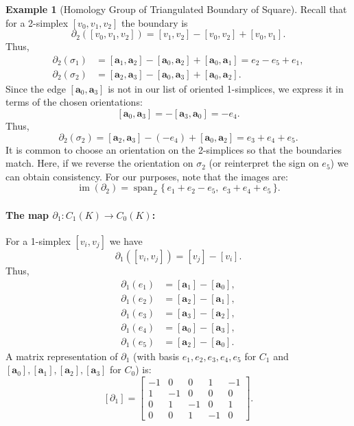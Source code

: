 \documentclass[12pt,oneside,reqno]{amsart}
\theoremstyle{plain}
\theoremstyle{definition}
\newtheorem{example}{Example}[section]
\theoremstyle{remark}
\newcommand{\0}{{\textbf{0}}}
\begin{document}
\begin{example}[Homology Group of Triangulated Boundary of Square]
Recall that for a 2-simplex \([v_0,v_1,v_2]\) the boundary is
\[
\partial_2([v_0,v_1,v_2]) = [v_1,v_2] - [v_0,v_2] + [v_0,v_1].
\]
Thus,
\[
\begin{aligned}
\partial_2(\sigma_1) &= [\bm{a}_1,\bm{a}_2] - [\bm{a}_0,\bm{a}_2] + [\bm{a}_0,\bm{a}_1] = e_2 - e_5 + e_1, \\
\partial_2(\sigma_2) &= [\bm{a}_2,\bm{a}_3] - [\bm{a}_0,\bm{a}_3] + [\bm{a}_0,\bm{a}_2].
\end{aligned}
\]
Since the edge \([\bm{a}_0, \bm{a}_3]\) is not in our list of oriented 1-simplices, we express it in terms of the chosen orientations:
\[
[\bm{a}_0,\bm{a}_3] = -[\bm{a}_3,\bm{a}_0] = -e_4.
\]
Thus, 
\[
\partial_2(\sigma_2) = [\bm{a}_2,\bm{a}_3] - (-e_4) + [\bm{a}_0,\bm{a}_2] = e_3 + e_4 + e_5.
\]
It is common to choose an orientation on the 2-simplices so that the boundaries match. Here, if we reverse the orientation on \(\sigma_2\) (or reinterpret the sign on \(e_5\)) we can obtain consistency. For our purposes, note that the images are:
\[
\operatorname{im}(\partial_2) = \operatorname{span}_{\mathbb{Z}}\{\, e_1 + e_2 - e_5,\; e_3 + e_4 + e_5 \,\}.
\]

\paragraph{The map \(\partial_1 \colon C_1(K) \to C_0(K)\):}

For a 1-simplex \([v_i,v_j]\) we have
\[
\partial_1([v_i,v_j]) = [v_j] - [v_i].
\]
Thus,
\[
\begin{aligned}
\partial_1(e_1) &= [\bm{a}_1] - [\bm{a}_0],\\[1mm]
\partial_1(e_2) &= [\bm{a}_2] - [\bm{a}_1],\\[1mm]
\partial_1(e_3) &= [\bm{a}_3] - [\bm{a}_2],\\[1mm]
\partial_1(e_4) &= [\bm{a}_0] - [\bm{a}_3],\\[1mm]
\partial_1(e_5) &= [\bm{a}_2] - [\bm{a}_0].
\end{aligned}
\]
A matrix representation of \(\partial_1\) (with basis \( e_1,e_2,e_3,e_4,e_5\) for \(C_1\) and \([\bm{a}_0],[\bm{a}_1],[\bm{a}_2],[\bm{a}_3]\) for \(C_0\)) is:
\[
[\partial_1] =
\begin{bmatrix}
-1 &  0 &  0 &  1 & -1 \\
 1 & -1 &  0 &  0 &  0 \\
 0 &  1 & -1 &  0 &  1 \\
 0 &  0 &  1 & -1 &  0 
\end{bmatrix}.
\]


\end{example}
\end{document}
